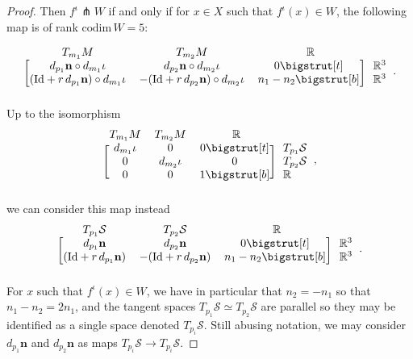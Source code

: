 \documentclass[11pt]{article}
\newcommand{\R}{\mathbb{R}}
\newcommand{\io}{\iota}
\newcommand{\nbf}{\mathbf{n}}
\newcommand{\Surf}{\mathcal{S}}
\newcommand{\Id}{\mathrm{Id}}
\newcommand\topstrut[1][1.2ex]{\setlength\bigstrutjot{#1}{\bigstrut[t]}}
\newcommand\botstrut[1][1.2ex]{\setlength\bigstrutjot{#1}{\bigstrut[b]}}
\theoremstyle{plain}
\theoremstyle{definition}
\theoremstyle{remark}
\begin{document}
\begin{proof}
		
		Then $f^\io \pitchfork W$ if and only if for $x \in X$ such that $f^\io(x) \in W$, the following map is of rank $\mathrm{codim} \, W = 5$:
		
		\begin{equation*}
			\begin{blockarray}{*{3}{c} l}
				\begin{block}{cccl}
					T_{m_1} M & T_{m_2} M & ~~\R~~ & \\
				\end{block}
				\begin{block}{[ccc] l}
					d_{p_1} \nbf \circ d_{m_1} \io & d_{p_2} \nbf \circ d_{m_2} \io & 0 \topstrut  & \R^3 \\
					(\Id + r \, d_{p_1} \nbf) \circ d_{m_1} \io & - (\Id + r \, d_{p_2} \nbf) \circ d_{m_2} \io & n_1 - n_2 \botstrut & \R^3 \\
				\end{block}
			\end{blockarray}.
		\end{equation*}
		Up to the isomorphism 
		\begin{equation*}
			\begin{blockarray}{*{3}{c} l}
				\begin{block}{cccl}
					T_{m_1} M & T_{m_2} M & ~~\R~~ & \\
				\end{block}
				\begin{block}{[ccc] l}
					d_{m_1} \io & 0 & 0 \topstrut  & T_{p_1} \Surf \\
					0 & d_{m_2} \io & 0 & T_{p_2} \Surf \\
					0 & 0 & 1 \botstrut & \R \\
				\end{block}
			\end{blockarray},
		\end{equation*} 
		we can consider this map instead
		\begin{equation*}
			\begin{blockarray}{*{3}{c} l}
				\begin{block}{cccl}
					T_{p_1} \Surf & T_{p_2} \Surf & ~~\R~~ & \\
				\end{block}
				\begin{block}{[ccc] l}
					d_{p_1} \nbf  & d_{p_2} \nbf & 0 \topstrut  & \R^3 \\
					(\Id + r \, d_{p_1} \nbf)  & - (\Id + r \, d_{p_2} \nbf)  & n_1 - n_2 \botstrut & \R^3 \\
				\end{block}
			\end{blockarray}.
		\end{equation*}
		For $x$ such that $f^\io(x) \in W$, we have in particular that $n_2 = - n_1$ so that $n_1 - n_2 = 2 n_1$, and the tangent spaces $T_{p_1} \Surf \simeq T_{p_2} \Surf$ are parallel so they may be identified as a single space denoted $T_{p_i} \Surf$. Still abusing notation, we may consider $d_{p_1} \nbf$ and $d_{p_2} \nbf$ as maps $T_{p_i} \Surf \to T_{p_i} \Surf$.
		

\end{proof}
\end{document}
